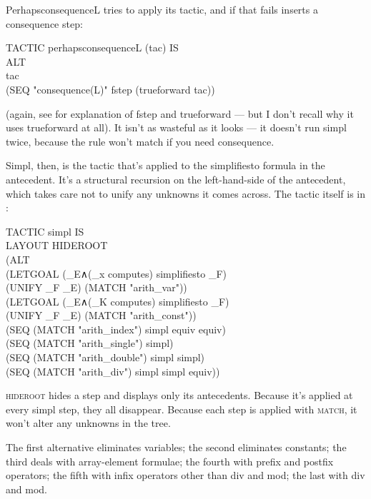 PerhapsconsequenceL tries to apply its tactic, and if that fails inserts a consequence step:
\begin{japeish}
TACTIC perhapsconsequenceL (tac) IS \\
\tab ALT \\
\tab \tab tac \\
\tab \tab (SEQ "consequence(L)" fstep (trueforward tac))
\end{japeish}
(again, see  for explanation of fstep and trueforward --- but I don't recall why it uses trueforward at all). It isn't as wasteful as it looks --- it doesn't run simpl twice, because the rule won't match if you need consequence.

Simpl, then, is the tactic that's applied to the simplifiesto formula in the antecedent. It's a structural recursion on the left-hand-side of the antecedent, which takes care not to unify any unknowns it comes across. The tactic itself is in :
\begin{japeish}
TACTIC simpl IS \\
\tab LAYOUT HIDEROOT \\
\tab \tab (ALT \\
\tab \tab \tab (LETGOAL (\_E∧(\_x computes) simplifiesto \_F) \\
\tab \tab \tab \tab (UNIFY \_F \_E) (MATCH "arith\_var")) \\
\tab \tab \tab (LETGOAL (\_E∧(\_K computes) simplifiesto \_F) \\
\tab \tab \tab \tab (UNIFY \_F \_E) (MATCH "arith\_const")) \\
\tab \tab \tab (SEQ (MATCH "arith\_index") simpl equiv equiv) \\
\tab \tab \tab (SEQ (MATCH "arith\_single") simpl) \\
\tab \tab \tab (SEQ (MATCH "arith\_double") simpl simpl) \\
\tab \tab \tab (SEQ (MATCH "arith\_div") simpl simpl equiv))
\end{japeish}
\textsc{hideroot} hides a step and displays only its antecedents. Because it's applied at every simpl step, they all disappear. Because each step is applied with \textsc{match}, it won't alter any unknowns in the tree.

The first alternative eliminates variables; the second eliminates constants; the third deals with array-element formulae; the fourth with prefix and postfix operators; the fifth with infix operators other than div and mod; the last with div and mod.

